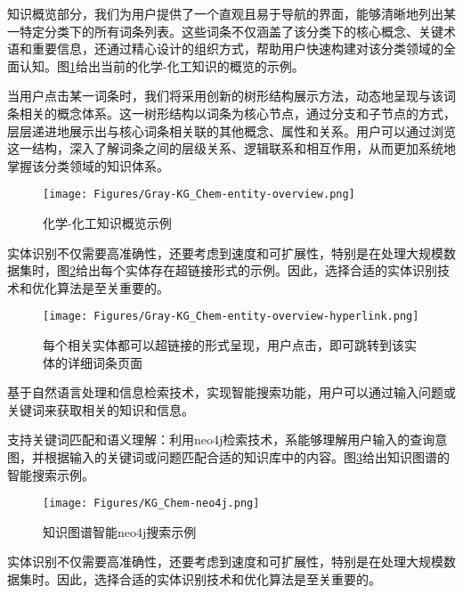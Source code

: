 知识概览部分，我们为用户提供了一个直观且易于导航的界面，能够清晰地列出某一特定分类下的所有词条列表。这些词条不仅涵盖了该分类下的核心概念、关键术语和重要信息，还通过精心设计的组织方式，帮助用户快速构建对该分类领域的全面认知。图\ref{Fig:KG-Chem_entity_overview}给出当前的化学-化工知识的概览的示例。

当用户点击某一词条时，我们将采用创新的树形结构展示方法，动态地呈现与该词条相关的概念体系。这一树形结构以词条为核心节点，通过分支和子节点的方式，层层递进地展示出与核心词条相关联的其他概念、属性和关系。用户可以通过浏览这一结构，深入了解词条之间的层级关系、逻辑联系和相互作用，从而更加系统地掌握该分类领域的知识体系。

\begin{figure}[h!]
\centering
\texttt{[image: Figures/Gray-KG\_Chem-entity-overview.png]}
\caption{\small\textrm{化学-化工知识概览示例}}%
\label{Fig:KG-Chem_entity_overview}
\end{figure}
实体识别不仅需要高准确性，还要考虑到速度和可扩展性，特别是在处理大规模数据集时，图\ref{Fig:KG-Chem_entity_overview-hyperlink}给出每个实体存在超链接形式的示例。因此，选择合适的实体识别技术和优化算法是至关重要的。

\begin{figure}[h!]
\centering
\texttt{[image: Figures/Gray-KG\_Chem-entity-overview-hyperlink.png]}
\caption{\small\textrm{每个相关实体都可以超链接的形式呈现，用户点击，即可跳转到该实体的详细词条页面}}%
\label{Fig:KG-Chem_entity_overview-hyperlink}
\end{figure}

基于自然语言处理和信息检索技术，实现智能搜索功能，用户可以通过输入问题或关键词来获取相关的知识和信息。

支持关键词匹配和语义理解：利用\textrm{neo4j}检索技术，系能够理解用户输入的查询意图，并根据输入的关键词或问题匹配合适的知识库中的内容。图\ref{Fig:KG-Chem_smart_search}给出知识图谱的智能搜索示例。
\begin{figure}[h!]
\centering
\texttt{[image: Figures/KG\_Chem-neo4j.png]}
\caption{\small\textrm{知识图谱智能\textrm{neo4j}搜索示例}}%
\label{Fig:KG-Chem_smart_search}
\end{figure}
实体识别不仅需要高准确性，还要考虑到速度和可扩展性，特别是在处理大规模数据集时。因此，选择合适的实体识别技术和优化算法是至关重要的。

